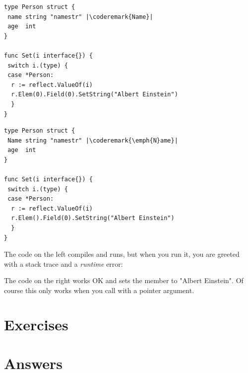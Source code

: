 \begin{minipage}{.5\textwidth}
\begin{lstlisting}[caption=Reflect with private member]
type Person struct {
 name string "namestr" |\coderemark{Name}|
 age  int
}

func Set(i interface{}) {
 switch i.(type) {
 case *Person:
  r := reflect.ValueOf(i)
  r.Elem(0).Field(0).SetString("Albert Einstein")
  }
}
\end{lstlisting}
\end{minipage}
\hspace{2em}
\begin{minipage}{.5\textwidth}
\begin{lstlisting}[caption=Reflect with public member]
type Person struct {
 Name string "namestr" |\coderemark{\emph{N}ame}|
 age  int
}

func Set(i interface{}) {
 switch i.(type) {
 case *Person:
  r := reflect.ValueOf(i)
  r.Elem().Field(0).SetString("Albert Einstein")
  }
}
\end{lstlisting}
\end{minipage}
The code on the left compiles and runs, but when you run it, you are greeted with a
stack trace and a \emph{runtime} error:

\noindent{}

\noindent{}The code on the right works OK and sets the member 
to "Albert Einstein". Of course this only works when you call 
with a pointer argument.

\section{Exercises}






\cleardoublepage
\section{Answers}
\shipoutAnswer
